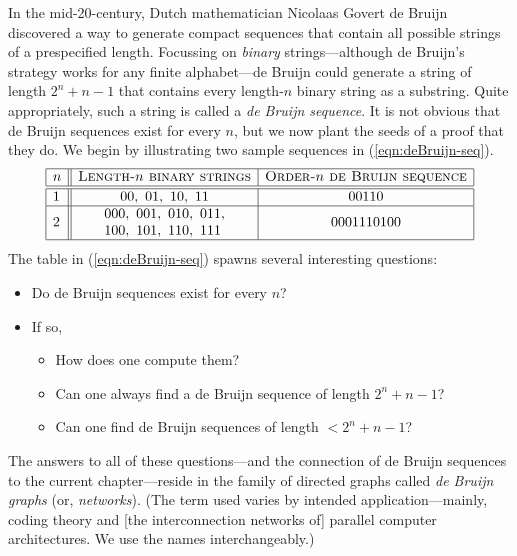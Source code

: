 In the mid-20-century, Dutch mathematician Nicolaas Govert de Bruijn
 discovered a way to generate
compact sequences that contain all possible strings of a prespecified
length.  Focussing on {\em binary} strings---although de Bruijn's
strategy works for any finite alphabet---de Bruijn could generate a
string of length $2^n +n-1$ that contains every length-$n$ binary
string as a substring.  Quite appropriately, such a string is called a
{\it de Bruijn sequence}.  It is not obvious
that de Bruijn sequences exist for every $n$, but we now plant the
seeds of a proof that they do.  We begin by illustrating two sample
sequences in (\ref{eqn:deBruijn-seq}).
\begin{equation}
\label{eqn:deBruijn-seq}
\begin{array}{|l||c|c|}
\hline
n & \mbox{\sc Length-$n$ binary strings}
    & \mbox{\sc Order-$n$ de Bruijn sequence} \\
\hline
\hline
1 &
00, \ 01, \ 10, \ 11  & 00110 \\
\hline
2 &
\begin{array}{l}
000, \ 001, \ 010, \ 011, \\
100, \ 101, \ 110, \ 111 
\end{array}
  & 0001110100 \\
\hline
\end{array}
\end{equation}
The table in (\ref{eqn:deBruijn-seq}) spawns several interesting
questions:
\begin{itemize}
\item
Do de Bruijn sequences exist for every $n$?
\item
If so, 
  \begin{itemize}
  \item
How does one compute them?
  \item
Can one always find a de Bruijn sequence of length $2^n +n-1$?
  \item
Can one find de Bruijn sequences of length $< 2^n +n-1$?
  \end{itemize}
\end{itemize}
The answers to all of these questions---and the connection of de
Bruijn sequences to the current chapter---reside in the family of
directed graphs called {\it de Bruijn graphs} (or, {\it networks}).
  (The term used
varies by intended application---mainly, coding theory and [the
  interconnection networks of] parallel computer architectures.  We
use the names interchangeably.)

